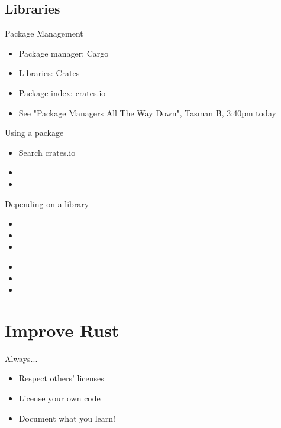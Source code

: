 \documentclass[xcolor={svgnames},hyperref]{beamer}
\begin{document}
\subsection{Libraries }

    \begin{frame}
        Package Management
        \begin{itemize}
            \item Package manager: Cargo
            \item Libraries: Crates
            \item Package index: crates.io
            \item See "Package Managers All The Way Down", Tasman B, 3:40pm today
        \end{itemize}
    \end{frame}

    \begin{frame}
        Using a package
        \begin{itemize}
            \item Search crates.io
            \item
            \item
        \end{itemize}
    \end{frame}


    \begin{frame}
        Depending on a library
        \begin{itemize}
            \item
            \item
            \item
        \end{itemize}
    \end{frame}

    \begin{frame}
        \begin{itemize}
            \item
            \item
            \item
        \end{itemize}
    \end{frame}


\section{Improve Rust}

    \begin{frame}
        Always...
        \begin{itemize}
            \item Respect others' licenses
            \item License your own code
            \item Document what you learn!
        \end{itemize}
    \end{frame}
\end{document}
